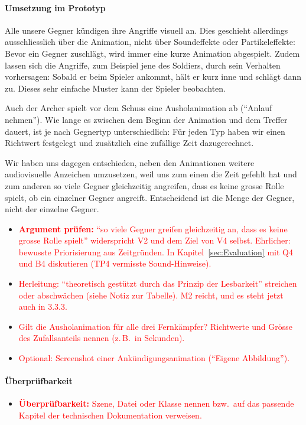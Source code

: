 \documentclass[../Main.tex]{subfiles}
\begin{document}
\paragraph{Umsetzung im Prototyp}
Alle unsere Gegner kündigen ihre Angriffe visuell an. Dies geschieht allerdings ausschliesslich über die Animation, nicht über Soundeffekte oder Partikeleffekte: Bevor ein Gegner zuschlägt, wird immer eine kurze Animation abgespielt. Zudem lassen sich die Angriffe, zum Beispiel jene des Soldiers, durch sein Verhalten vorhersagen: Sobald er beim Spieler ankommt, hält er kurz inne und schlägt dann zu. Dieses sehr einfache Muster kann der Spieler beobachten.

Auch der Archer spielt vor dem Schuss eine Ausholanimation ab (\enquote{Anlauf nehmen}). Wie lange es zwischen dem Beginn der Animation und dem Treffer dauert, ist je nach Gegnertyp unterschiedlich: Für jeden Typ haben wir einen Richtwert festgelegt und zusätzlich eine zufällige Zeit dazugerechnet.

Wir haben uns dagegen entschieden, neben den Animationen weitere audiovisuelle Anzeichen umzusetzen, weil uns zum einen die Zeit gefehlt hat und zum anderen so viele Gegner gleichzeitig angreifen, dass es keine grosse Rolle spielt, ob ein einzelner Gegner angreift. Entscheidend ist die Menge der Gegner, nicht der einzelne Gegner.

\begin{itemize}[leftmargin=1.5cm]
    \item \textcolor{red}{\textbf{Argument prüfen:} \enquote{so viele Gegner greifen gleichzeitig an, dass es keine grosse Rolle spielt} widerspricht V2 und dem Ziel von V4 selbst. Ehrlicher: bewusste Priorisierung aus Zeitgründen. In Kapitel~\ref{sec:Evaluation} mit Q4 und B4 diskutieren (TP4 vermisste Sound-Hinweise).}
    \item \textcolor{red}{Herleitung: \enquote{theoretisch gestützt durch das Prinzip der Lesbarkeit} streichen oder abschwächen (siehe Notiz zur Tabelle).  M2 reicht, und es steht jetzt auch in 3.3.3.}
    \item \textcolor{red}{Gilt die Ausholanimation für alle drei Fernkämpfer? Richtwerte und Grösse des Zufallsanteils nennen (z.\,B.\ in Sekunden).}
    \item \textcolor{red}{Optional: Screenshot einer Ankündigungsanimation (\enquote{Eigene Abbildung}).}
\end{itemize}

\paragraph{Überprüfbarkeit}
\begin{itemize}[leftmargin=1.5cm]
    \item \textcolor{red}{\textbf{Überprüfbarkeit:} Szene, Datei oder Klasse nennen bzw.\ auf das passende Kapitel der technischen Dokumentation verweisen.}
\end{itemize}
\end{document}
